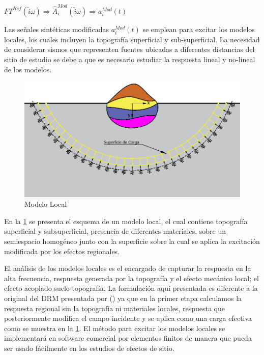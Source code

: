 \documentclass[spanish,letterpaper,12pt,twoside,openany]{article}
\begin{document}
\begin{large}
	$FT^{Ref} \left( \hat{i} \omega \right) \Rightarrow \widehat{A}^{Mod}_{i} \left( \hat{i} \omega \right) \Rightarrow a_{i}^{Mod}\left( t \right)$
\end{large}

Las señales sintéticas modificadas $a_{i}^{Mod}\left( t \right)$ se emplean para excitar los modelos locales, los cuales incluyen la topografía superficial y sub-superficial. La necesidad de considerar sismos que representen fuentes ubicadas a diferentes distancias del sitio de estudio se debe a que es necesario estudiar la respuesta lineal y no-lineal de los modelos.

\begin{figure}[H]
	\centering
	\includegraphics[width=12 cm]{img/Local.pdf}
	\vspace{-.5 cm}
	\caption{Modelo Local}
	\label{fig:local}
	\vspace{-1 cm}
\end{figure}
%
En la \cref{fig:local} se presenta el esquema de un modelo local, el cual contiene topografía superficial y subsuperficial, presencia de diferentes materiales, sobre un semiespacio homogéneo junto con la superficie sobre la cual se aplica la excitación modificada por los efectos regionales.

El análisis de los modelos locales es el encargado de capturar la respuesta en la alta frecuencia, respuesta generada por la topografía y el efecto mecánico local; el efecto acoplado suelo-topografía. La formulación aquí presentada es diferente a la original del DRM presentada por \citeauthor{bielak2003} (\citeyear{bielak2003}) ya que en la primer etapa calculamos la respuesta regional sin la topografía ni materiales locales, respuesta que posteriormente modifica el campo incidente y se aplica como una carga efectiva como se muestra en la \cref{fig:local}. El método para excitar los modelos locales se implementará en software comercial por elementos finitos de manera que pueda ser usado fácilmente en los estudios de efectos de sitio.
\end{document}

